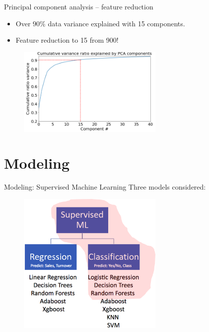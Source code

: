 \begin{frame}{Principal component analysis -- feature reduction}
\begin{itemize}
    \item Over $90\%$ data variance explained with 15 components.
    \item Feature reduction to 15 from 900!
\end{itemize}
\begin{figure}
		\includegraphics[width=7.0cm]{figures/pca.png}
	\end{figure}

\end{frame}


\section{Modeling} %

\begin{frame}{Modeling: Supervised Machine Learning}
Three models considered:
\begin{figure}
		\includegraphics[width=7.0cm]{figures/ML.png}
	\end{figure}
\end{frame}


